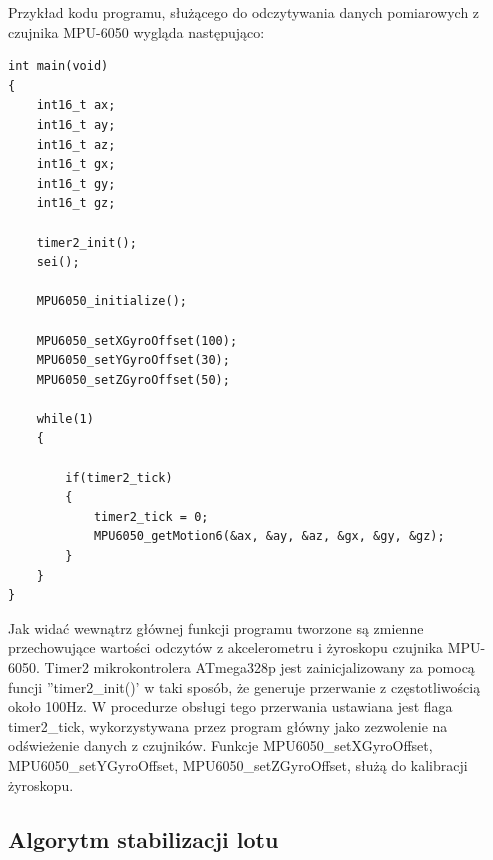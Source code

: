 Przykład kodu programu, służącego do odczytywania danych pomiarowych z czujnika MPU-6050 wygląda następująco:

\begin{lstlisting}
int main(void)
{
	int16_t ax;
	int16_t ay;
	int16_t az;
	int16_t gx;
	int16_t gy;
	int16_t gz;

	timer2_init();
	sei();

	MPU6050_initialize();

	MPU6050_setXGyroOffset(100);
	MPU6050_setYGyroOffset(30);
	MPU6050_setZGyroOffset(50);

	while(1)
	{
		
		if(timer2_tick)
		{
			timer2_tick = 0;
			MPU6050_getMotion6(&ax, &ay, &az, &gx, &gy, &gz);
		}
	}
}
\end{lstlisting}

Jak widać wewnątrz głównej funkcji programu tworzone są zmienne przechowujące wartości odczytów z akcelerometru i żyroskopu czujnika MPU-6050. Timer2 mikrokontrolera ATmega328p jest zainicjalizowany za pomocą funcji ''timer2\_init()' w taki sposób, że generuje przerwanie z częstotliwością około 100Hz. W procedurze obsługi tego przerwania ustawiana jest flaga timer2\_tick, wykorzystywana przez program główny jako zezwolenie na odświeżenie danych z czujników. Funkcje MPU6050\_setXGyroOffset, MPU6050\_setYGyroOffset, MPU6050\_setZGyroOffset, służą do kalibracji żyroskopu.

\subsection{Algorytm stabilizacji lotu}

